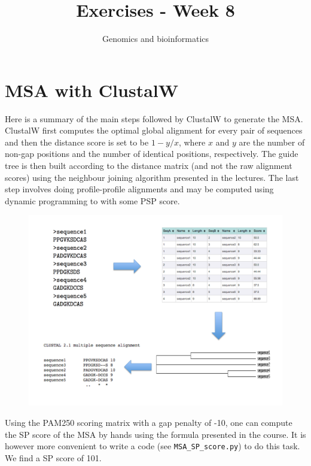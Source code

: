 \documentclass[a4paper,11pt]{article}
\title{Exercises - Week 8}
\date{}
\author{Genomics and bioinformatics}
\begin{document}
\maketitle

\section{MSA with ClustalW}

\noindent Here is a summary of the main steps followed by ClustalW to generate the MSA. ClustalW first computes the optimal global alignment for every pair of sequences and then the distance score is set to be $1-y/x$, where $x$ and $y$ are the number of non-gap positions and the number of identical positions, respectively. The guide tree is then built according to the distance matrix (and not the raw alignment scores) using the neighbour joining algorithm presented in the lectures. The last step involves doing profile-profile alignments and may be computed using dynamic programming to with some PSP score. 

\begin{figure}[h!]
\hspace{-10mm}\includegraphics[width=17.5cm]{Fig1.pdf}
\end{figure}

\noindent Using the PAM250 scoring matrix with a gap penalty of -10, one can compute the SP score of the MSA by hands using the formula presented in the course. It is however more convenient to write a code (see \verb|MSA_SP_score.py|) to do this task. We find a SP score of 101.
\end{document}
